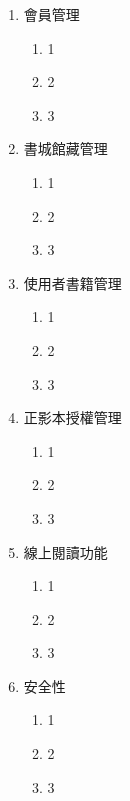 \begin{enumerate}
    \item 會員管理
        \begin{enumerate}
            \item 1
            \item 2
            \item 3
        \end{enumerate}

    \item 書城館藏管理
        \begin{enumerate}
            \item 1
            \item 2
            \item 3
        \end{enumerate}

    \item 使用者書籍管理
        \begin{enumerate}
            \item 1
            \item 2
            \item 3
        \end{enumerate}

    \item 正影本授權管理
        \begin{enumerate}
            \item 1
            \item 2
            \item 3
        \end{enumerate}

    \item 線上閱讀功能
        \begin{enumerate}
            \item 1
            \item 2
            \item 3
        \end{enumerate}

    \item 安全性
        \begin{enumerate}
            \item 1
            \item 2
            \item 3
        \end{enumerate}
\end{enumerate}